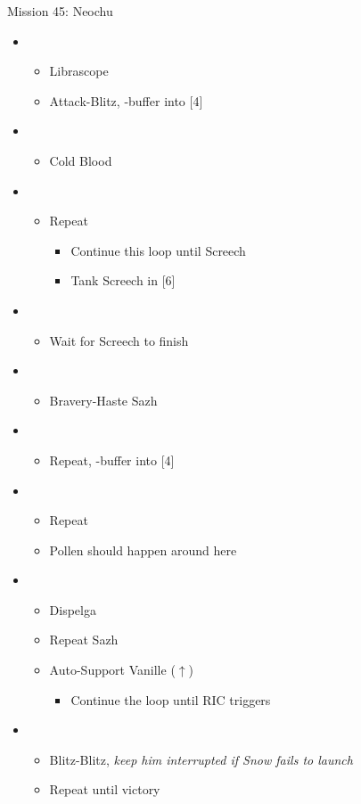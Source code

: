 \begin{battle}{Mission 45: Neochu}
	\begin{itemize}
		\item \second
			\begin{itemize}
				\item Librascope
				\item Attack-Blitz, \rav-buffer into [4]
			\end{itemize}
		\item \fifth
			\begin{itemize}
				\item Cold Blood
			\end{itemize}
		\item \third
			\begin{itemize}
				\item Repeat
					\begin{itemize}
						\item Continue this loop until Screech
						\item Tank Screech in [6]
					\end{itemize}
			\end{itemize}		
		\item \sixth
			\begin{itemize}
				\item Wait for Screech to finish
			\end{itemize}
		\item \fourth
			\begin{itemize}
				\item Bravery-Haste Sazh
			\end{itemize}
		\item \second
			\begin{itemize}
				\item Repeat, \rav-buffer into [4]
			\end{itemize}
		\item \fifth
			\begin{itemize}
				\item Repeat
				\item Pollen should happen around here
			\end{itemize}
		\item \fourth
			\begin{itemize}
				\item Dispelga
				\item Repeat Sazh
				\item Auto-Support Vanille ($\uparrow$)
					\begin{itemize}
						\item Continue the loop until RIC triggers
					\end{itemize}
			\end{itemize}
		\item \first
			\begin{itemize}
				\item Blitz-Blitz, \textit{keep him interrupted if Snow fails to launch}
				\item Repeat until victory
			\end{itemize}
	\end{itemize}
\end{battle}

